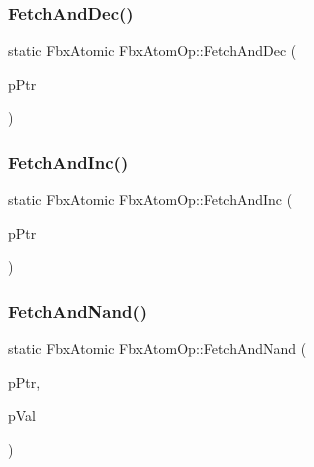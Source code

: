 \mbox{\label{class_fbx_atom_op_a8b0f537c04b2c5be48e4498a4b512e22}} 
\subsubsection{\texorpdfstring{Fetch\+And\+Dec()}{FetchAndDec()}}
{\footnotesize\ttfamily static Fbx\+Atomic Fbx\+Atom\+Op\+::\+Fetch\+And\+Dec (\begin{DoxyParamCaption}\item[{volatile Fbx\+Atomic $\ast$}]{p\+Ptr }\end{DoxyParamCaption})\hspace{0.3cm}{\ttfamily [static]}}

\mbox{\label{class_fbx_atom_op_ac442236600db5268031a9e8045a97753}} 
\subsubsection{\texorpdfstring{Fetch\+And\+Inc()}{FetchAndInc()}}
{\footnotesize\ttfamily static Fbx\+Atomic Fbx\+Atom\+Op\+::\+Fetch\+And\+Inc (\begin{DoxyParamCaption}\item[{volatile Fbx\+Atomic $\ast$}]{p\+Ptr }\end{DoxyParamCaption})\hspace{0.3cm}{\ttfamily [static]}}

\mbox{\label{class_fbx_atom_op_a21483c95a1d27b79dbdc70c8c9cd25f2}} 
\subsubsection{\texorpdfstring{Fetch\+And\+Nand()}{FetchAndNand()}}
{\footnotesize\ttfamily static Fbx\+Atomic Fbx\+Atom\+Op\+::\+Fetch\+And\+Nand (\begin{DoxyParamCaption}\item[{volatile Fbx\+Atomic $\ast$}]{p\+Ptr,  }\item[{Fbx\+Atomic}]{p\+Val }\end{DoxyParamCaption})\hspace{0.3cm}{\ttfamily [static]}}

